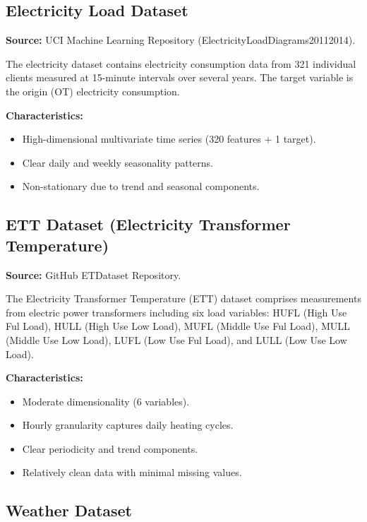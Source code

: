 \documentclass[conference]{IEEEtran}
\begin{document}
\subsection{Electricity Load Dataset}

\textbf{Source:} UCI Machine Learning Repository
(ElectricityLoadDiagrams20112014).

The electricity dataset contains electricity consumption data from
321 individual clients measured at 15-minute intervals over several
years. The target variable is the origin (OT) electricity consumption.

\textbf{Characteristics:}

\begin{itemize}
    \item High-dimensional multivariate time series (320 features +
    1 target).
    \item Clear daily and weekly seasonality patterns.
    \item Non-stationary due to trend and seasonal components.
\end{itemize}

\subsection{ETT Dataset (Electricity Transformer Temperature)}

\textbf{Source:} GitHub ETDataset Repository.

The Electricity Transformer Temperature (ETT) dataset comprises
measurements from electric power transformers
including six load variables: HUFL (High Use Ful Load),
HULL (High Use Low Load), MUFL (Middle Use Ful Load),
MULL (Middle Use Low Load), LUFL (Low Use Ful Load), and
LULL (Low Use Low Load).

\textbf{Characteristics:}

\begin{itemize}
    \item Moderate dimensionality (6 variables).
    \item Hourly granularity captures daily heating cycles.
    \item Clear periodicity and trend components.
    \item Relatively clean data with minimal missing values.
\end{itemize}

\subsection{Weather Dataset}
\end{document}
